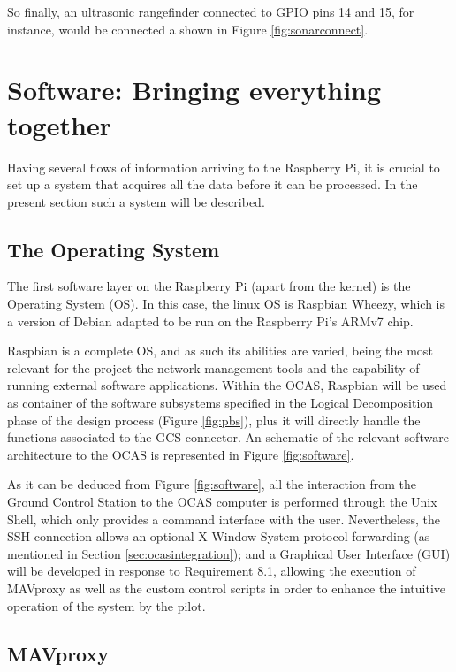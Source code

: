So finally, an ultrasonic rangefinder connected to GPIO pins 14 and 15, for instance, would be connected a shown in Figure \ref{fig:sonarconnect}.




\section{Software: Bringing everything together}

Having several flows of information arriving to the Raspberry Pi, it is crucial to set up a system that acquires all the data before it can be processed. 
In the present section such a system will be described.

\subsection{The Operating System}

The first software layer on the Raspberry Pi (apart from the kernel) is the Operating System (OS).
In this case, the linux OS is Raspbian Wheezy, which is a version of Debian adapted to be run on the Raspberry Pi's ARMv7 chip.

Raspbian is a complete OS, and as such its abilities are varied, being the most relevant for the project the network management tools and the capability of running external software applications.
Within the OCAS, Raspbian will be used as container of the software subsystems specified in the Logical Decomposition phase of the design process (Figure \ref{fig:pbs}), plus it will directly handle the functions associated to the GCS connector.
An schematic of the relevant software architecture to the OCAS is represented in Figure \ref{fig:software}.



As it can be deduced from Figure \ref{fig:software}, all the interaction from the Ground Control Station to the OCAS computer is performed through the Unix Shell, which only provides a command interface with the user.
Nevertheless, the SSH connection allows an optional X Window System protocol forwarding (as mentioned in Section \ref{sec:ocasintegration}); and a Graphical User Interface (GUI) will be developed in response to Requirement 8.1, allowing the execution of MAVproxy as well as the custom control scripts in order to enhance the intuitive operation of the system by the pilot.

\subsection{MAVproxy} \label{sec:mavproxy}


